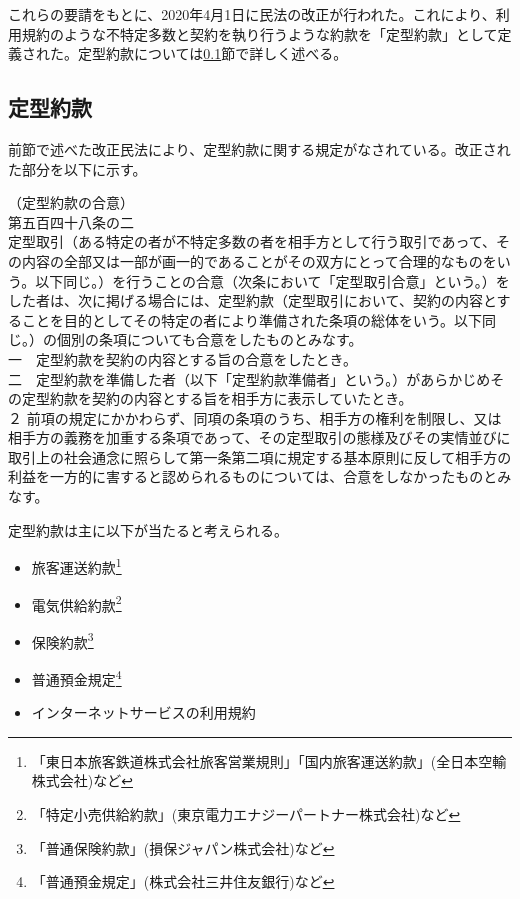 これらの要請をもとに、2020年4月1日に民法の改正が行われた。これにより、利用規約のような不特定多数と契約を執り行うような約款を「定型約款」として定義された。定型約款については\ref{sub:定型約款}節で詳しく述べる。

\subsection{定型約款}
\label{sub:定型約款}
前節で述べた改正民法により、定型約款に関する規定がなされている。改正された部分を以下に示す。

\begin{screen}
  （定型約款の合意）\\
  第五百四十八条の二\\
  定型取引（ある特定の者が不特定多数の者を相手方として行う取引であって、その内容の全部又は一部が画一的であることがその双方にとって合理的なものをいう。以下同じ。）を行うことの合意（次条において「定型取引合意」という。）をした者は、次に掲げる場合には、定型約款（定型取引において、契約の内容とすることを目的としてその特定の者により準備された条項の総体をいう。以下同じ。）の個別の条項についても合意をしたものとみなす。\\
  一　定型約款を契約の内容とする旨の合意をしたとき。\\
  二　定型約款を準備した者（以下「定型約款準備者」という。）があらかじめその定型約款を契約の内容とする旨を相手方に表示していたとき。\\
  ２ 前項の規定にかかわらず、同項の条項のうち、相手方の権利を制限し、又は相手方の義務を加重する条項であって、その定型取引の態様及びその実情並びに取引上の社会通念に照らして第一条第二項に規定する基本原則に反して相手方の利益を一方的に害すると認められるものについては、合意をしなかったものとみなす。
\end{screen}

定型約款は主に以下が当たると考えられる。
\begin{itemize}
  \item 旅客運送約款\footnote{「東日本旅客鉄道株式会社旅客営業規則」「国内旅客運送約款」(全日本空輸株式会社)など}
  \item 電気供給約款\footnote{「特定小売供給約款」(東京電力エナジーパートナー株式会社)など}
  \item 保険約款\footnote{「普通保険約款」(損保ジャパン株式会社)など}
  \item 普通預金規定\footnote{「普通預金規定」(株式会社三井住友銀行)など}
  \item インターネットサービスの利用規約
\end{itemize}

